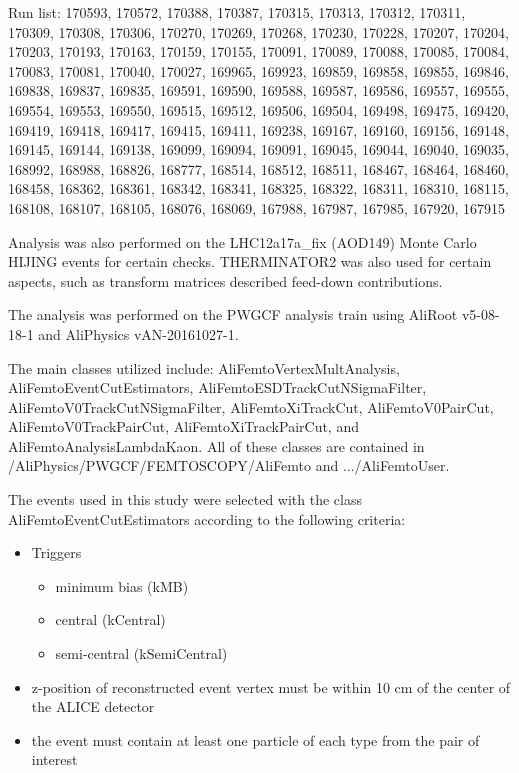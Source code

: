 \documentclass[ALICE,manyauthors]{cernphprep}
\begin{document}
Run list:  	
170593, 170572, 170388, 170387, 170315, 170313, 170312, 170311, 170309, 170308, 170306, 170270, 170269, 170268, 170230, 170228, 170207, 170204, 170203, 170193, 170163, 170159, 170155, 170091, 170089, 170088, 170085, 170084, 170083, 170081, 170040, 170027, 169965, 169923, 169859, 169858, 169855, 169846, 169838, 169837, 169835, 169591, 169590, 169588, 169587, 169586, 169557, 169555, 169554, 169553, 169550, 169515, 169512, 169506, 169504, 169498, 169475, 169420, 169419, 169418, 169417, 169415, 169411, 169238, 169167, 169160, 169156, 169148, 169145, 169144, 169138, 169099, 169094, 169091, 169045, 169044, 169040, 169035, 168992, 168988, 168826, 168777, 168514, 168512, 168511, 168467, 168464, 168460, 168458, 168362, 168361, 168342, 168341, 168325, 168322, 168311, 168310, 168115, 168108, 168107, 168105, 168076, 168069, 167988, 167987, 167985, 167920, 167915

Analysis was also performed on the LHC12a17a\_fix (AOD149) Monte Carlo HIJING events for certain checks.  THERMINATOR2 was also used for certain aspects, such as transform matrices described feed-down contributions.

The analysis was performed on the PWGCF analysis train using AliRoot v5-08-18-1 and AliPhysics vAN-20161027-1.

The main classes utilized include: AliFemtoVertexMultAnalysis, AliFemtoEventCutEstimators, AliFemtoESDTrackCutNSigmaFilter, AliFemtoV0TrackCutNSigmaFilter, AliFemtoXiTrackCut, AliFemtoV0PairCut, AliFemtoV0TrackPairCut, AliFemtoXiTrackPairCut, and AliFemtoAnalysisLambdaKaon.
All of these classes are contained in /AliPhysics/PWGCF/FEMTOSCOPY/AliFemto and .../AliFemtoUser.


The events used in this study were selected with the class AliFemtoEventCutEstimators according to the following criteria:

\begin{itemize}
 \itemsep0em
 \item Triggers
 \begin{itemize}
  \itemsep0em
  \item minimum bias (kMB)
  \item central (kCentral)
  \item semi-central (kSemiCentral)
 \end{itemize}
 \item z-position of reconstructed event vertex must be within 10 cm of the center of the ALICE detector
 \item the event must contain at least one particle of each type from the pair of interest
\end{itemize}
\end{document}
